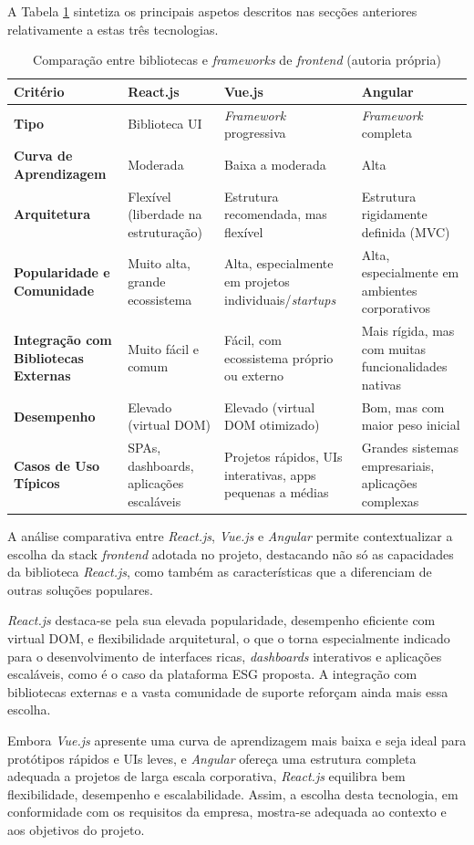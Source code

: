 A Tabela \ref{tab:comparacao_frontend} sintetiza os principais aspetos descritos nas secções anteriores relativamente a estas três tecnologias.

\begin{table}[H]
\centering
\begin{tabular}{|p{3cm}|p{3.3cm}|p{3.3cm}|p{3.3cm}|}
\hline
\textbf{Critério} & \textbf{React.js} & \textbf{Vue.js} & \textbf{Angular} \\
\hline
\textbf{Tipo} & Biblioteca UI & \textit{Framework} progressiva & \textit{Framework} completa \\
\hline
\textbf{Curva de Aprendizagem} & Moderada & Baixa a moderada & Alta \\
\hline
\textbf{Arquitetura} & Flexível (liberdade na estruturação) & Estrutura recomendada, mas flexível & Estrutura rigidamente definida (MVC) \\
\hline
\textbf{Popularidade e Comunidade} & Muito alta, grande ecossistema & Alta, especialmente em projetos individuais/\textit{startups} & Alta, especialmente em ambientes corporativos \\
\hline
\textbf{Integração com Bibliotecas Externas} & Muito fácil e comum & Fácil, com ecossistema próprio ou externo & Mais rígida, mas com muitas funcionalidades nativas \\
\hline
\textbf{Desempenho} & Elevado (virtual DOM) & Elevado (virtual DOM otimizado) & Bom, mas com maior peso inicial \\
\hline
\textbf{Casos de Uso Típicos} & SPAs, dashboards, aplicações escaláveis & Projetos rápidos, UIs interativas, apps pequenas a médias & Grandes sistemas empresariais, aplicações complexas \\
\hline
\end{tabular}
\caption{Comparação entre bibliotecas e \textit{frameworks} de \textit{frontend} (autoria própria)}
\label{tab:comparacao_frontend}
\end{table}

A análise comparativa entre \textit{React.js}, \textit{Vue.js} e \textit{Angular} permite contextualizar a escolha da stack \textit{frontend} adotada no projeto, destacando não só as capacidades da biblioteca \textit{React.js}, como também as características que a diferenciam de outras soluções populares.

\textit{React.js} destaca-se pela sua elevada popularidade, desempenho eficiente com virtual DOM, e flexibilidade arquitetural, o que o torna especialmente indicado para o desenvolvimento de interfaces ricas, \textit{dashboards} interativos e aplicações escaláveis, como é o caso da plataforma ESG proposta. A integração com bibliotecas externas e a vasta comunidade de suporte reforçam ainda mais essa escolha.

Embora \textit{Vue.js} apresente uma curva de aprendizagem mais baixa e seja ideal para protótipos rápidos e UIs leves, e \textit{Angular} ofereça uma estrutura completa adequada a projetos de larga escala corporativa, \textit{React.js} equilibra bem flexibilidade, desempenho e escalabilidade. Assim, a escolha desta tecnologia, em conformidade com os requisitos da empresa, mostra-se adequada ao contexto e aos objetivos do projeto.


 \vspace{20mm}